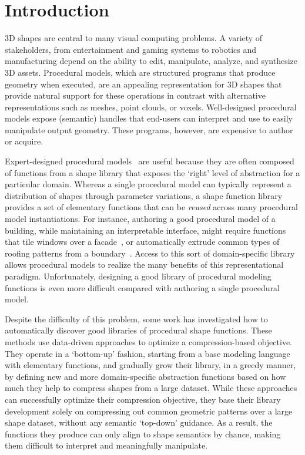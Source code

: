 \section{Introduction}

3D shapes are central to many visual computing problems.
A variety of stakeholders, from entertainment and gaming systems to robotics and manufacturing depend on the ability to edit, manipulate, analyze, and synthesize 3D assets. 
Procedural models, which are structured programs that produce geometry when executed, are an appealing representation for 3D shapes that provide natural support for these operations in contrast with alternative representations such as meshes, point clouds, or voxels. 
Well-designed procedural models expose (semantic) handles that end-users can interpret and use to easily manipulate output geometry. These programs, however, are expensive to author or acquire.

Expert-designed procedural models~\cite{wonka2003instant, muller2006procedural, pearl2022geocode} are useful because they are often composed of functions from a shape library that exposes the `right' level of abstraction for a particular domain.
Whereas a single procedural model can typically represent a distribution of shapes through parameter variations, a shape function library provides a set of elementary functions that can be \textit{reused} across many procedural model instantiations. 
For instance, authoring a good procedural model of a building, while maintaining an interpretable interface, might require functions that tile windows over a facade~\cite{wonka2003instant}, or automatically extrude common types of roofing patterns from a boundary~\cite{muller2006procedural}.
Access to this sort of domain-specific library allows procedural models to realize the many benefits of this representational paradigm.
Unfortunately, designing a good library of procedural modeling functions is even more difficult compared with authoring a single procedural model.

Despite the difficulty of this problem, some work has investigated how to automatically discover good libraries of procedural shape functions.
These methods use data-driven approaches to optimize a compression-based objective.
They operate in a `bottom-up' fashion, starting from a base modeling language with elementary functions, and gradually grow their library, in a greedy manner, by defining new and more domain-specific abstraction functions based on how much they help to compress shapes from a large dataset. 
While these approaches can successfully optimize their compression objective, 
they base their library development solely on compressing out common geometric patterns over a large shape dataset, without any semantic `top-down' guidance. 
As a result, the functions they produce can only align to shape semantics by chance, making them difficult to interpret and meaningfully manipulate.

